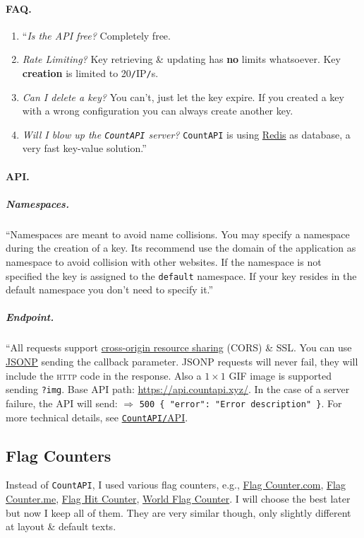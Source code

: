 \documentclass{article}
\numberwithin{equation}{section}
\begin{document}
\paragraph{FAQ.}
\begin{enumerate}
	\item ``\textit{Is the API free?} Completely free.
	\item \textit{Rate Limiting?} Key retrieving \& updating has \textbf{no} limits whatsoever. Key \textbf{creation} is limited to 20\texttt{/}IP\texttt{/}s.
	\item \textit{Can I delete a key?} You can't, just let the key expire. If you created a key with a wrong configuration you can always create another key.
	\item \textit{Will I blow up the \texttt{CountAPI} server?} \texttt{CountAPI} is using \href{https://redis.io/}{Redis} as database, a very fast key-value solution.''
\end{enumerate}

\paragraph{API.}

\subparagraph{Namespaces.} ``Namespaces are meant to avoid name collisions. You may specify a namespace during the creation of a key. Its recommend use the domain of the application as namespace to avoid collision with other websites. If the namespace is not specified the key is assigned to the \texttt{default} namespace. If your key resides in the default namespace you don't need to specify it.''

\subparagraph{Endpoint.} ``All requests support \href{https://developer.mozilla.org/en-US/docs/Web/HTTP/CORS}{cross-origin resource sharing} (CORS) \& SSL. You can use \href{https://en.wikipedia.org/wiki/JSONP}{JSONP} sending the callback parameter. JSONP requests will never fail, they will include the \textsc{http} code in the response. Also a $1\times 1$ GIF image is supported sending \texttt{?img}. Base API path: \url{https://api.countapi.xyz/}. In the case of a server failure, the API will send: $\Rightarrow$ \verb|500 { "error": "Error description" }|. For more technical details, see \href{https://countapi.xyz/#api}{\texttt{CountAPI}\texttt{/}API}.

\subsection{Flag Counters}
Instead of \texttt{CountAPI}, I used various flag counters, e.g., \href{https://flagcounter.com/}{Flag Counter.com}, \href{https://www.flagcounter.me/}{Flag Counter.me}, \href{https://flaghitcounter.com/}{Flag Hit Counter}, \href{https://www.worldflagcounter.com/}{World Flag Counter}. I will choose the best later but now I keep all of them. They are very similar though, only slightly different at layout \& default texts.
\end{document}
